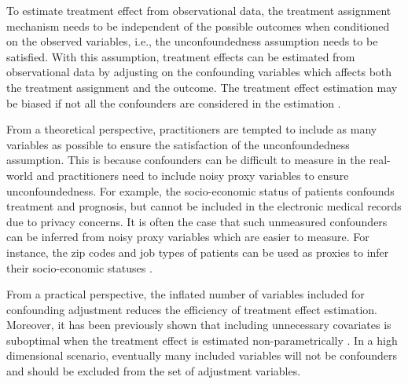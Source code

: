\documentclass[letterpaper]{article} %
\begin{document}

To estimate treatment effect from observational data, the treatment assignment mechanism needs to be independent of the possible outcomes when conditioned on the observed variables, i.e., the unconfoundedness assumption \cite{Rosenbaum1983} needs to be satisfied. With this assumption, treatment effects can be estimated from observational data by adjusting on the confounding variables which affects both the treatment assignment and the outcome. The treatment effect estimation may be biased if not all the confounders are considered in the estimation \cite{Pearl2009}.

From a theoretical perspective, practitioners are tempted to include as many variables as possible to ensure the satisfaction of the unconfoundedness assumption.
This is because confounders can be difficult to measure in the real-world and practitioners need to include noisy proxy variables to ensure unconfoundedness. 
For example, the socio-economic status of patients confounds treatment and prognosis, but cannot be included in the electronic medical records due to privacy concerns. It is often the case that such unmeasured confounders can be inferred from noisy proxy variables which are easier to measure. For instance, the zip codes and job types of patients can be used as proxies to infer their socio-economic statuses \cite{Sauer2013}. 

From a practical perspective, the inflated number of variables included for confounding adjustment reduces the efficiency of treatment effect estimation. 
Moreover, it has been previously shown that including unnecessary covariates is suboptimal when the treatment effect is estimated non-parametrically \cite{Hahn1998,Abadie2006,Haeggstroem2017}. In a high dimensional scenario, eventually many included variables will not be confounders and should be excluded from the set of adjustment variables. 
\end{document}
